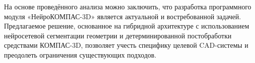 На основе проведённого анализа можно заключить, что разработка программного модуля «НейроКОМПАС-3D» является актуальной и востребованной задачей. Предлагаемое решение, основанное на гибридной архитектуре с использованием нейросетевой сегментации геометрии и детерминированной постобработки средствами КОМПАС-3D, позволяет учесть специфику целевой CAD-системы и преодолеть ограничения существующих подходов.